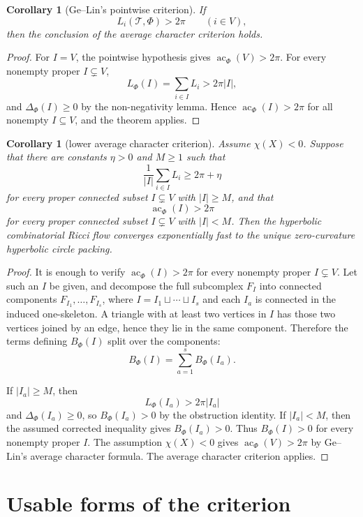\documentclass[11pt]{article}
\newtheorem{corollary}[theorem]{Corollary}
\newcommand{\T}{\mathcal T}
\newcommand{\Phiw}{\Phi}
\newcommand{\ac}{\operatorname{ac}}
\begin{document}
\begin{corollary}[Ge--Lin's pointwise criterion]
If
\[
  L_i(\T,\Phiw)>2\pi
  \qquad (i\in V),
\]
then the conclusion of the average character criterion holds.
\end{corollary}

\begin{proof}
For $I=V$, the pointwise hypothesis gives $\ac_\Phi(V)>2\pi$.  For every
nonempty proper $I\subsetneq V$,
\[
  L_\Phi(I)=\sum_{i\in I}L_i>2\pi |I|,
\]
and $\Delta_\Phi(I)\ge0$ by the non-negativity lemma.  Hence
$\ac_\Phi(I)>2\pi$ for all nonempty $I\subseteq V$, and the theorem
applies.
\end{proof}

\begin{corollary}[lower average character criterion]
Assume $\chi(X)<0$.  Suppose that there are constants $\eta>0$ and
$M\ge1$ such that
\[
  \frac{1}{|I|}\sum_{i\in I}L_i\ge2\pi+\eta
\]
for every proper connected subset $I\subsetneq V$ with $|I|\ge M$, and
that
\[
  \ac_\Phi(I)>2\pi
\]
for every proper connected subset $I\subsetneq V$ with $|I|<M$.  Then the
hyperbolic combinatorial Ricci flow converges exponentially fast to the
unique zero-curvature hyperbolic circle packing.
\end{corollary}

\begin{proof}
It is enough to verify $\ac_\Phi(I)>2\pi$ for every nonempty proper
$I\subsetneq V$.  Let such an $I$ be given, and decompose the full
subcomplex $F_I$ into connected components $F_{I_1},\dots,F_{I_s}$, where
$I=I_1\sqcup\cdots\sqcup I_s$ and each $I_a$ is connected in the induced
one-skeleton.  A triangle with at least two vertices in $I$ has those two
vertices joined by an edge, hence they lie in the same component.  Therefore
the terms defining $B_\Phi(I)$ split over the components:
\[
  B_\Phi(I)=\sum_{a=1}^s B_\Phi(I_a).
\]

If $|I_a|\ge M$, then
\[
  L_\Phi(I_a)>2\pi |I_a|
\]
and $\Delta_\Phi(I_a)\ge0$, so $B_\Phi(I_a)>0$ by the obstruction identity.
If $|I_a|<M$, then the assumed corrected inequality gives
$B_\Phi(I_a)>0$.  Thus $B_\Phi(I)>0$ for every nonempty proper $I$.
The assumption $\chi(X)<0$ gives $\ac_\Phi(V)>2\pi$ by Ge--Lin's average
character formula.  The average character criterion applies.
\end{proof}

\section{Usable forms of the criterion}
\end{document}
